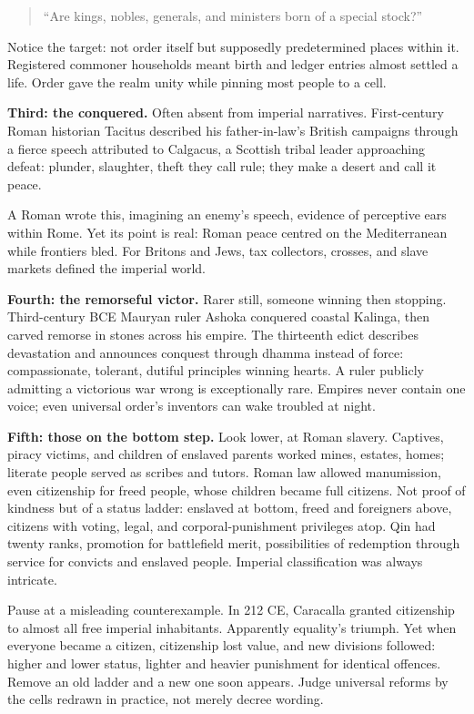 \begin{quote}
``Are kings, nobles, generals, and ministers born of a special stock?''
\end{quote}
Notice the target: not order itself but supposedly predetermined places within it. Registered commoner households meant birth and ledger entries almost settled a life. Order gave the realm unity while pinning most people to a cell.

\textbf{Third: the conquered.} Often absent from imperial narratives. First-century Roman historian Tacitus described his father-in-law's British campaigns through a fierce speech attributed to Calgacus, a Scottish tribal leader approaching defeat: plunder, slaughter, theft they call rule; they make a desert and call it peace.

A Roman wrote this, imagining an enemy's speech, evidence of perceptive ears within Rome. Yet its point is real: Roman peace centred on the Mediterranean while frontiers bled. For Britons and Jews, tax collectors, crosses, and slave markets defined the imperial world.

\textbf{Fourth: the remorseful victor.} Rarer still, someone winning then stopping. Third-century BCE Mauryan ruler Ashoka conquered coastal Kalinga, then carved remorse in stones across his empire. The thirteenth edict describes devastation and announces conquest through dhamma instead of force: compassionate, tolerant, dutiful principles winning hearts. A ruler publicly admitting a victorious war wrong is exceptionally rare. Empires never contain one voice; even universal order's inventors can wake troubled at night.

\textbf{Fifth: those on the bottom step.} Look lower, at Roman slavery. Captives, piracy victims, and children of enslaved parents worked mines, estates, homes; literate people served as scribes and tutors. Roman law allowed manumission, even citizenship for freed people, whose children became full citizens. Not proof of kindness but of a status ladder: enslaved at bottom, freed and foreigners above, citizens with voting, legal, and corporal-punishment privileges atop. Qin had twenty ranks, promotion for battlefield merit, possibilities of redemption through service for convicts and enslaved people. Imperial classification was always intricate.

Pause at a misleading counterexample. In 212 CE, Caracalla granted citizenship to almost all free imperial inhabitants. Apparently equality's triumph. Yet when everyone became a citizen, citizenship lost value, and new divisions followed: higher and lower status, lighter and heavier punishment for identical offences. Remove an old ladder and a new one soon appears. Judge universal reforms by the cells redrawn in practice, not merely decree wording.

